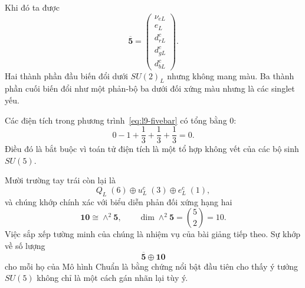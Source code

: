 Khi đó ta được
\begin{equation}
\overline{\mathbf5}
=
\begin{pmatrix}
\nu_{eL}\\
e_L\\
d^c_{rL}\\
d^c_{gL}\\
d^c_{bL}
\end{pmatrix}.
\label{eq:l9-fivebar}
\end{equation}
Hai thành phần đầu biến đổi dưới \(SU(2)_L\) nhưng không mang màu. Ba thành phần cuối biến đổi như một phản-bộ ba dưới đối xứng màu nhưng là các singlet yếu.

\begin{classroomqa}
\end{classroomqa}

Các điện tích trong phương trình~\eqref{eq:l9-fivebar} có tổng bằng 0:
\begin{equation}
0-1+\frac13+\frac13+\frac13=0.
\label{eq:l9-fivebar-charge-sum}
\end{equation}
Điều đó là bắt buộc vì toán tử điện tích là một tổ hợp không vết của các bộ sinh \(SU(5)\).

\begin{classroomqa}
\end{classroomqa}

Mười trường tay trái còn lại là
\begin{equation}
Q_L\;(6)
\oplus
u^c_L\;(3)
\oplus
e^c_L\;(1),
\end{equation}
và chúng khớp chính xác với biểu diễn phản đối xứng hạng hai
\begin{equation}
\mathbf{10}\cong\wedge^2\mathbf5,
\qquad
\dim\wedge^2\mathbf5=\binom52=10.
\label{eq:l9-ten-preview}
\end{equation}
Việc sắp xếp tường minh của chúng là nhiệm vụ của bài giảng tiếp theo. Sự khớp về số lượng
\begin{equation}
\overline{\mathbf5}\oplus\mathbf{10}
\end{equation}
cho mỗi họ của Mô hình Chuẩn là bằng chứng nổi bật đầu tiên cho thấy ý tưởng \(SU(5)\) không chỉ là một cách gán nhãn lại tùy ý.

